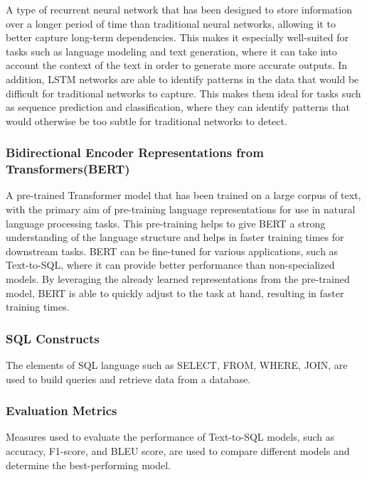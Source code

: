 A type of recurrent neural network that has been designed to store information over a longer period of time than traditional neural networks, allowing it to better capture long-term dependencies\cite{Hochreiter1997LongSM}. This makes it especially well-suited for tasks such as language modeling and text generation, where it can take into account the context of the text in order to generate more accurate outputs. In addition, LSTM networks are able to identify patterns in the data that would be difficult for traditional networks to capture. This makes them ideal for tasks such as sequence prediction and classification, where they can identify patterns that would otherwise be too subtle for traditional networks to detect.

\subsubsection{Bidirectional Encoder Representations from Transformers(BERT)}

A pre-trained Transformer model that has been trained on a large corpus of text, with the primary aim of pre-training language representations for use in natural language processing tasks\cite{devlin-etal-2019-bert}. This pre-training helps to give BERT a strong understanding of the language structure and helps in faster training times for downstream tasks. BERT can be fine-tuned for various applications, such as Text-to-SQL, where it can provide better performance than non-specialized models. By leveraging the already learned representations from the pre-trained model, BERT is able to quickly adjust to the task at hand, resulting in faster training times.

\subsubsection{SQL Constructs}

The elements of SQL language such as SELECT, FROM, WHERE, JOIN, are used to build queries and retrieve data from a database.

\subsubsection{Evaluation Metrics}

Measures used to evaluate the performance of Text-to-SQL models, such as accuracy, F1-score, and BLEU score, are used to compare different models and determine the best-performing model.

